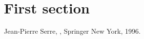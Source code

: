 \documentclass{article}
\begin{document}

\section{First section}



\begin{thebibliography}{99}
Jean-Pierre Serre, , Springer New York, 1996.
\end{thebibliography}
\end{document}
